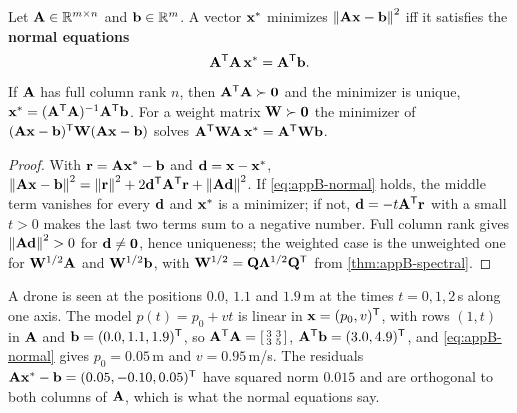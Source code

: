 \begin{theorem}
\label{thm:appB-normal}
Let $\mathbf{A} \in \mathbb{R}^{m \times n}$ and $\mathbf{b} \in \mathbb{R}^m$. A vector $\mathbf{x}^*$ minimizes $\left\lVert \mathbf{A}\mathbf{x} - \mathbf{b} \right\rVert^2$ iff it satisfies the \textbf{normal equations}
\begin{equation}
  \mathbf{A}^{\mathsf{T}}\mathbf{A}\,\mathbf{x}^* = \mathbf{A}^{\mathsf{T}}\mathbf{b}.
  \label{eq:appB-normal}
\end{equation}
If $\mathbf{A}$ has full column rank $n$, then $\mathbf{A}^{\mathsf{T}}\mathbf{A} \succ \mathbf{0}$ and the minimizer is unique, $\mathbf{x}^* = (\mathbf{A}^{\mathsf{T}}\mathbf{A})^{-1}\mathbf{A}^{\mathsf{T}}\mathbf{b}$. For a weight matrix $\mathbf{W} \succ \mathbf{0}$ the minimizer of $(\mathbf{A}\mathbf{x} - \mathbf{b})^{\mathsf{T}}\mathbf{W}(\mathbf{A}\mathbf{x} - \mathbf{b})$ solves $\mathbf{A}^{\mathsf{T}}\mathbf{W}\mathbf{A}\,\mathbf{x}^* = \mathbf{A}^{\mathsf{T}}\mathbf{W}\mathbf{b}$.
\end{theorem}
\begin{proof}
With $\mathbf{r} = \mathbf{A}\mathbf{x}^* - \mathbf{b}$ and $\mathbf{d} = \mathbf{x} - \mathbf{x}^*$, $\left\lVert \mathbf{A}\mathbf{x} - \mathbf{b} \right\rVert^2 = \left\lVert \mathbf{r} \right\rVert^2 + 2\mathbf{d}^{\mathsf{T}}\mathbf{A}^{\mathsf{T}}\mathbf{r} + \left\lVert \mathbf{A}\mathbf{d} \right\rVert^2$. If \cref{eq:appB-normal} holds, the middle term vanishes for every $\mathbf{d}$ and $\mathbf{x}^*$ is a minimizer; if not, $\mathbf{d} = -t\mathbf{A}^{\mathsf{T}}\mathbf{r}$ with a small $t > 0$ makes the last two terms sum to a negative number. Full column rank gives $\left\lVert \mathbf{A}\mathbf{d} \right\rVert^2 > 0$ for $\mathbf{d} \ne \mathbf{0}$, hence uniqueness; the weighted case is the unweighted one for $\mathbf{W}^{1/2}\mathbf{A}$ and $\mathbf{W}^{1/2}\mathbf{b}$, with $\mathbf{W}^{1/2} = \mathbf{Q}\mathbf{\Lambda}^{1/2}\mathbf{Q}^{\mathsf{T}}$ from \cref{thm:appB-spectral}. \qedhere
\end{proof}

\begin{example}
\label{ex:appB-lsq}
A drone is seen at the positions $0.0$, $1.1$ and $1.9$\,m at the times $t = 0, 1, 2$\,s along one axis. The model $p(t) = p_0 + vt$ is linear in $\mathbf{x} = (p_0, v)^{\mathsf{T}}$, with rows $(1, t)$ in $\mathbf{A}$ and $\mathbf{b} = (0.0, 1.1, 1.9)^{\mathsf{T}}$, so $\mathbf{A}^{\mathsf{T}}\mathbf{A} = \begin{bsmallmatrix} 3 & 3\\ 3 & 5\end{bsmallmatrix}$, $\mathbf{A}^{\mathsf{T}}\mathbf{b} = (3.0, 4.9)^{\mathsf{T}}$, and \cref{eq:appB-normal} gives $p_0 = 0.05$\,m and $v = 0.95$\,m/s. The residuals $\mathbf{A}\mathbf{x}^* - \mathbf{b} = (0.05, -0.10, 0.05)^{\mathsf{T}}$ have squared norm $0.015$ and are orthogonal to both columns of $\mathbf{A}$, which is what the normal equations say.
\end{example}

